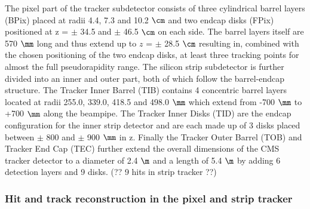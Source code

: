 The pixel part of the tracker subdetector consists of three cylindrical barrel layers (BPix) placed at radii 4.4, 7.3 and 10.2 $\cm$ and two endcap disks (FPix) positioned at z = $\pm$ 34.5 and $\pm$ 46.5 $\cm$ on each side. The barrel layers itself are 570 $\mm$ long and thus extend up to $z$ = $\pm$ 28.5 $\cm$ resulting in, combined with the chosen positioning of the two endcap disks, at least three tracking points for almost the full pseudorapidity range. The silicon strip subdetector is further divided into an inner and outer part, both of which follow the barrel-endcap structure. The Tracker Inner Barrel (TIB) contains 4 concentric barrel layers located at radii 255.0, 339.0, 418.5 and 498.0 $\mm$ which extend from -700 $\mm$ to +700 $\mm$ along the beampipe. The Tracker Inner Disks (TID) are the endcap configuration for the inner strip detector and are each made up of 3 disks placed between $\pm$ 800 and $\pm$ 900 $\mm$ in z. Finally the Tracker Outer Barrel (TOB) and Tracker End Cap (TEC) further extend the overall dimensions of the CMS tracker detector to a diameter of 2.4 $\m$ and a length of 5.4 $\m$ by adding 6 detection layers and 9 disks. (?? 9 hits in strip tracker ??)

\subsubsection*{Hit and track reconstruction in the pixel and strip tracker}

